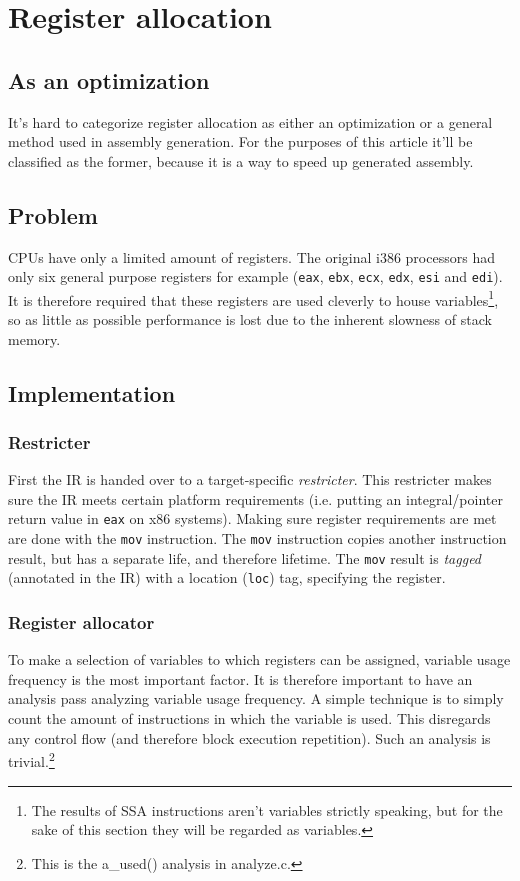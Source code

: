 \documentclass[12pt, a4paper]{article}
\begin{document}
  \section{Register allocation}
  \label{sec:regalloc}
  \subsection{As an optimization}
It's hard to categorize register allocation as either an optimization or a
general method used in assembly generation. For the purposes of this article
it'll be classified as the former, because it is a way to speed up generated
assembly.

\subsection{Problem}
CPUs have only a limited amount of registers. The original i386 processors had
only six general purpose registers for example (\verb+eax+, \verb+ebx+, \verb+ecx+,
\verb+edx+, \verb+esi+ and \verb+edi+).\cite[section~3.4.1]{intel} It is
therefore required that these registers are used cleverly to house variables\footnote{The
results of SSA instructions aren't variables strictly speaking, but for the sake
of this section they will be regarded as variables.}, so
as little as possible performance is lost due to the inherent slowness of stack
memory.

\subsection{Implementation}
\subsubsection{Restricter}
First the IR is handed over to a target-specific \textit{restricter}. This
restricter makes sure the IR meets certain platform requirements (i.e.
putting an integral/pointer return value in \verb+eax+ on x86 systems).
Making sure register requirements are met are done with the \verb+mov+ instruction.
The \verb+mov+ instruction copies another instruction result, but has a separate
life, and therefore lifetime. The \verb+mov+ result is \textit{tagged}
(annotated in the IR) with a location (\verb+loc+) tag, specifying the register.

\subsubsection{Register allocator}
To make a selection of variables to which registers can be assigned, variable
usage frequency is the most important factor. It is therefore important to
have an analysis pass analyzing variable usage frequency. A simple technique
is to simply count the amount of instructions in which the variable is used. This
disregards any control flow (and therefore block execution repetition). Such
an analysis is trivial.\footnote{This is the a\_used() analysis in analyze.c.}
\end{document}
